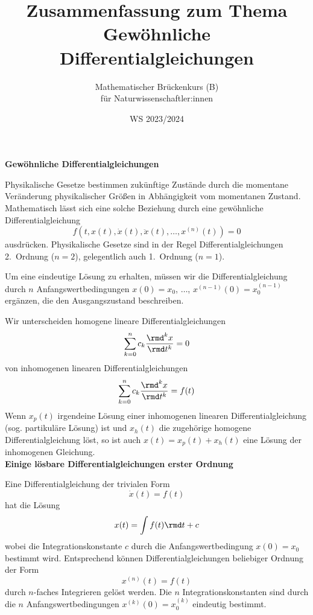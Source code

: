 \documentclass[a4paper,10pt]{article}
\title{Zusammenfassung zum Thema \\ Gewöhnliche Differentialgleichungen}
\author{Mathematischer Brückenkurs (B)\\für Naturwissenschaftler:innen}
\date{WS 2023/2024}
\begin{document}
\parindent0pt
\maketitle


{\bf Gewöhnliche Differentialgleichungen}

Physikalische Gesetze bestimmen zukünftige Zustände durch die momentane
Veränderung physikalischer Größen in Abhängigkeit vom momentanen Zustand.
Mathematisch lässt sich eine solche Beziehung durch eine gewöhnliche
Differentialgleichung
\[
f(t,x(t),\dot{x}(t),\ddot{x}(t),\ldots,x^{(n)}(t))=0
\]
ausdrücken.
Physikalische Gesetze sind in der Regel Differentialgleichungen
2.~Ordnung ($n=2$), gelegentlich auch 1.~Ordnung ($n=1$).

Um eine eindeutige Lösung zu erhalten, müssen wir die
Differentialgleichung durch $n$ Anfangswertbedingungen
$x(0)=x_{0}$, $\ldots$, $x^{(n-1)}(0)=x^{(n-1)}_{0}$ ergänzen,
die den Ausgangszustand beschreiben.



Wir unterscheiden homogene lineare Differentialgleichungen
\[
\sum_{k=0}^n c_k\frac{\rmd^kx}{\rmd t^k}=0
\]
von inhomogenen linearen Differentialgleichungen
\[
\sum_{k=0}^n c_k\frac{\rmd^kx}{\rmd t^k}=f(t)
\]
Wenn $x_p(t)$ irgendeine Lösung einer inhomogenen linearen
Differentialgleichung (sog. partikuläre Lösung) ist
und $x_h(t)$ die zugehörige homogene Differentialgleichung löst, so
ist auch $x(t)=x_p(t)+ x_h(t)$ eine Lösung der inhomogenen Gleichung.\\

{\bf Einige lösbare Differentialgleichungen erster Ordnung}

Eine Differentialgleichung der trivialen Form
\[
\dot{x}(t)=f(t)
\]
hat die Lösung
\[
x(t)=\int f(t)\rmd t + c
\]
wobei die Integrationskonstante $c$ durch die Anfangswertbedingung
$x(0)=x_0$ bestimmt wird.
Entsprechend können Differentialgleichungen beliebiger Ordnung der Form
\[
x^{(n)}(t)=f(t)
\]
durch $n$-faches Integrieren gelöst werden. Die $n$ Integrationskonstanten
sind durch die $n$ Anfangswertbedingungen $x^{(k)}(0)=x_0^{(k)}$
eindeutig bestimmt.
\end{document}
